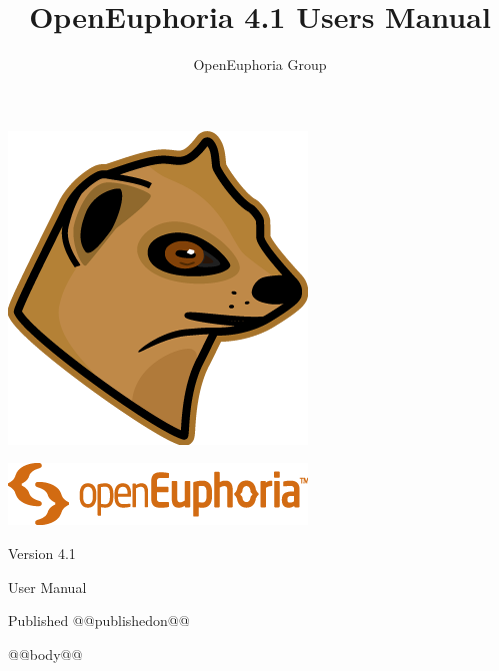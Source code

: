 \documentclass[openany]{book}
\begin{document}
\frontmatter
\title{OpenEuphoria 4.1 Users Manual}
\author{OpenEuphoria Group}
{\centering%
  \includegraphics{./images/300px-mongoose-head-colour-v2-r0.png}%
  \par\vspace*{40pt}%
  \includegraphics{./images/300px-logo-logotype-orange-v2-r0.png}%
  \par{\fontsize{28}{36}\selectfont Version 4.1}%
  \vspace*{90pt}%
  \par{\fontsize{48}{58}\selectfont User Manual}%
  \vspace*{12pt}%
  \par{Published @@publishedon@@}%
  \newpage%
}

\setcounter{tocdepth}{1}
\tableofcontents

\pagestyle{fancy}
\mainmatter

@@body@@
\end{document}

